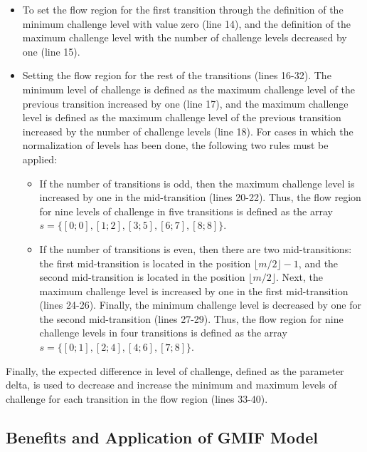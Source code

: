 \begin{itemize}
\item To set the flow region for the first transition through the definition of the minimum challenge level with value zero (line 14), and the definition of the maximum challenge level with the number of challenge levels decreased by one (line 15).
\item Setting the flow region for the rest of the transitions (lines 16-32). The minimum level of challenge is defined as the maximum challenge level of the previous transition increased by one (line 17), and the maximum challenge level is defined as the maximum challenge level of the previous transition increased by the number of challenge levels (line 18). For cases in which the normalization of levels has been done, the following two rules must be applied:

\begin{itemize}
\item If the number of transitions is odd, then the maximum challenge level is increased by one in the mid-transition (lines 20-22). Thus, the flow region for nine levels of challenge in five transitions is defined as the array $s = \{[0;0], [1;2], [3;5], [6;7], [8;8]\}$.
\item If the number of transitions is even, then there are two mid-transitions: the first mid-transition is located in the position $\lfloor m/2 \rfloor - 1$, and the second mid-transition is located in the position $\lfloor m/2 \rfloor$. Next, the maximum challenge level is increased by one in the first mid-transition (lines 24-26). Finally, the minimum challenge level is decreased by one for the second mid-transition (lines 27-29). Thus, the flow region for nine challenge levels in four transitions is defined as the array $s = \{[0;1], [2;4], [4;6], [7;8]\}$.
\end{itemize}
\end{itemize}

Finally, the expected difference in level of challenge, defined as the parameter delta, is used to decrease and increase the minimum and maximum levels of challenge for each transition in the flow region (lines 33-40).

\subsection{Benefits and Application of GMIF Model}

